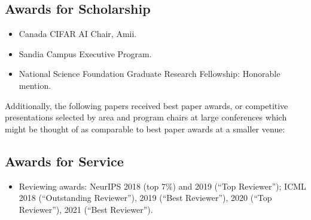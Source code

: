\documentclass[10pt]{article}
\begin{document}
\subsection{Awards for Scholarship} %

\begin{itemize}[leftmargin=5em]
  \item[2021] {Canada CIFAR AI Chair, Amii. } %

  \item[2014--16] Sandia Campus Executive Program. 
  \item[2013] National Science Foundation Graduate Research Fellowship: Honorable mention.
\end{itemize}

Additionally, the following papers received best paper awards,
or competitive presentations selected by area and program chairs at large conferences
which might be thought of as comparable to best paper awards at a smaller venue:
\begin{itemize}[leftmargin=5em]
  
\end{itemize}

\subsection{Awards for Service} %
\begin{itemize}
  \item[] Reviewing awards: NeurIPS 2018 (top 7\%) and 2019 (``Top Reviewer''); ICML 2018 (``Outstanding Reviewer''), 2019 (``Best Reviewer''), 2020 (``Top Reviewer''), 2021 (``Best Reviewer'').
\end{itemize}
\end{document}
